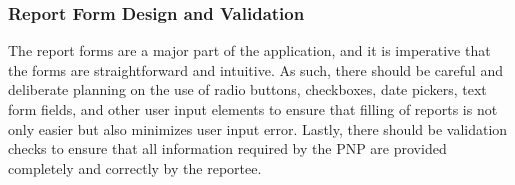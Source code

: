 \subsubsection{Report Form Design and Validation}
The report forms are a major part of the application, and it is imperative that the forms are  straightforward and intuitive. As such, there should be careful and deliberate planning on the use of radio buttons, checkboxes, date pickers, text form fields, and other user input elements to ensure that filling of reports is not only easier but also minimizes user input error. Lastly, there should be validation checks to ensure that all information required by the PNP are provided completely and correctly by the reportee.